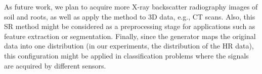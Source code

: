 \documentclass[10pt,twocolumn,letterpaper]{article}
\begin{document}
As future work, we plan to acquire more X-ray backscatter radiography images of soil and roots, as well as apply the method to 3D data, e.g., CT scans. Also, this SR method might be considered as a preprocessing stage for applications such as feature extraction or segmentation. Finally, since the generator maps the original data into one distribution (in our experiments, the distribution of the HR data), this configuration might be applied in classification problems where the signals are acquired by different sensors.


{\small


}
\end{document}
